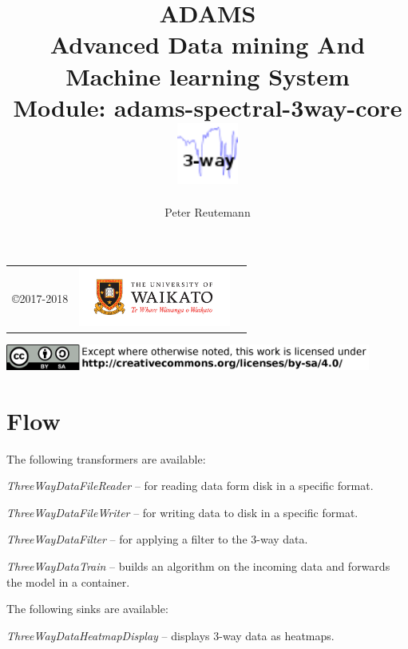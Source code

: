 \documentclass[a4paper]{book}
\title{
  \textbf{ADAMS} \\
  {\Large \textbf{A}dvanced \textbf{D}ata mining \textbf{A}nd \textbf{M}achine
  learning \textbf{S}ystem} \\
  {\Large Module: adams-spectral-3way-core} \\
  \vspace{1cm}
  \includegraphics[width=2cm]{images/spectral-3way-core-module.png} \\
}
\author{
  Peter Reutemann
}
\begin{document}
\begin{titlepage}
\maketitle

\thispagestyle{empty}
\center
\begin{table}[b]
	\begin{tabular}{c l l}
		\parbox[c][2cm]{2cm}{\copyright 2017-2018} &
		\parbox[c][2cm]{5cm}{\includegraphics[width=5cm]{images/coat_of_arms.pdf}} \\
	\end{tabular}
	\includegraphics[width=12cm]{images/cc.png} \\
\end{table}

\end{titlepage}

\tableofcontents

\chapter{Flow}
The following transformers are available:
\begin{tight_itemize}
  \item \textit{ThreeWayDataFileReader} -- for reading data form disk in a
  specific format.
  \item \textit{ThreeWayDataFileWriter} -- for writing data to disk in a
  specific format.
  \item \textit{ThreeWayDataFilter} -- for applying a filter to the 3-way data.
  \item \textit{ThreeWayDataTrain} -- builds an algorithm on the incoming data
  and forwards the model in a container.
\end{tight_itemize}

\noindent The following sinks are available:
\begin{tight_itemize}
  \item \textit{ThreeWayDataHeatmapDisplay} -- displays 3-way data as heatmaps.
\end{tight_itemize}
\end{document}
